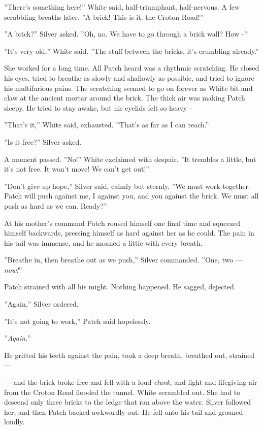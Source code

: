 \documentclass[12pt]{book}
\begin{document}
''There's something here!'' White said, half-triumphant, half-nervous. A few scrabbling breaths later. ''A brick! This is it, the Croton Road!''

''A brick?'' Silver asked. ''Oh, no. We have to go through a brick wall? How -''

''It's very old,'' White said. ''The stuff between the bricks, it's crumbling already.''

She worked for a long time. All Patch heard was a rhythmic scratching. He closed his eyes, tried to breathe as slowly and shallowly as possible, and tried to ignore his multifarious pains. The scratching seemed to go on forever as White bit and claw at the ancient mortar around the brick. The thick air was making Patch sleepy. He tried to stay awake, but his eyelids felt so heavy -

''That's it,'' White said, exhausted. ''That's as far as I can reach.''

''Is it free?'' Silver asked.

A moment passed. ''No!'' White exclaimed with despair. ''It trembles a little, but it's not free. It won't move! We can't get out!''

''Don't give up hope,'' Silver said, calmly but sternly. ''We must work together. Patch will push against me, I against you, and you against the brick. We must all push as hard as we can. Ready?''

At his mother's command Patch roused himself one final time and squeezed himself backwards, pressing himself as hard against her as he could. The pain in his tail was immense, and he moaned a little with every breath.

''Breathe in, then breathe out as we push,'' Silver commanded. ''One, two ---
{\it now!}''

Patch strained with all his might. Nothing happened. He sagged, dejected.

''Again,'' Silver ordered.

''It's not going to work,'' Patch said hopelessly.

''{\it Again.}''

He gritted his teeth against the pain, took a deep breath, breathed out, strained ---

---
and the brick broke free and fell with a loud {\it clunk}, and light and lifegiving air from the Croton Road flooded the tunnel. White scrambled out. She had to descend only three bricks to the ledge that ran above the water. Silver followed her, and then Patch backed awkwardly out. He fell onto his tail and groaned loudly.
\end{document}

